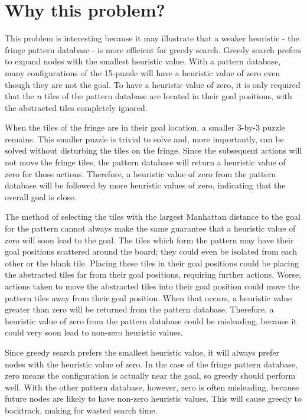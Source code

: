 \documentclass[letterpaper,11pt]{article}
\begin{document}
\section{Why this problem?}

This problem is interesting because it may illustrate that a weaker heuristic - the fringe pattern database - is more efficient for greedy search.  Greedy search prefers to expand nodes with the smallest heuristic value.  With a pattern database, many configurations of the 15-puzzle will have a heuristic value of zero even though they are not the goal.  To have a heuristic value of zero, it is only required that the $n$ tiles of the pattern database are located in their goal positions, with the abstracted tiles completely ignored.

When the tiles of the fringe are in their goal location, a smaller 3-by-3 puzzle remains.  This smaller puzzle is trivial to solve and, more importantly, can be solved without disturbing the tiles on the fringe.  Since the subsequent actions will not move the fringe tiles, the pattern database will return a heuristic value of zero for those actions.  Therefore, a heuristic value of zero from the pattern database will be followed by more heuristic values of zero, indicating that the overall goal is close.

The method of selecting the tiles with the largest Manhattan distance to the goal for the pattern cannot always make the same guarantee that a heuristic value of zero will soon lead to the goal.  The tiles which form the pattern may have their goal positions scattered around the board; they could even be isolated from each other or the blank tile.  Placing these tiles in their goal positions could be placing the abstracted tiles far from their goal positions, requiring further actions.  Worse, actions taken to move the abstracted tiles into their goal position could move the pattern tiles away from their goal position.  When that occurs, a heuristic value greater than zero will be returned from the pattern database.  Therefore, a heuristic value of zero from the pattern database could be misleading, because it could very soon lead to non-zero heuristic values.

Since greedy search prefers the smallest heuristic value, it will always prefer nodes with the heuristic value of zero.  In the case of the fringe pattern database, zero means the configuration is actually near the goal, so greedy should perform well.  With the other pattern database, however, zero is often misleading, because future nodes are likely to have non-zero heuristic values.  This will cause greedy to backtrack, making for wasted search time.
\end{document}
